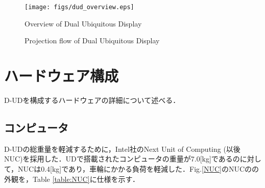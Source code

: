 \documentclass[12pt]{sonota/aislab}
\begin{document}
\begin{figure}[t]
\begin{center}
\texttt{[image: figs/dud\_overview.eps]}
\caption{Overview of Dual Ubiquitous Display}
\label{DUD}
\end{center}
\end{figure}


\begin{figure}[htbp]

	\begin{center}
	\end{center}
	
	\caption{Projection flow of Dual Ubiquitous Display}
	\label{fig:twofig}
\end{figure}



\section{ハードウェア構成}
D-UDを構成するハードウェアの詳細について述べる．
\subsection{コンピュータ}
D-UDの総重量を軽減するために，Intel社のNext Unit of Computing (以後 NUC)を採用した．UDで搭載されたコンピュータの重量が7.0[kg]であるのに対して，NUCは0.4[kg]であり，車輪にかかる負荷を軽減した．Fig.\ref{NUC}のNUCのの外観を，Table \ref{table:NUC}に仕様を示す．
\end{document}

